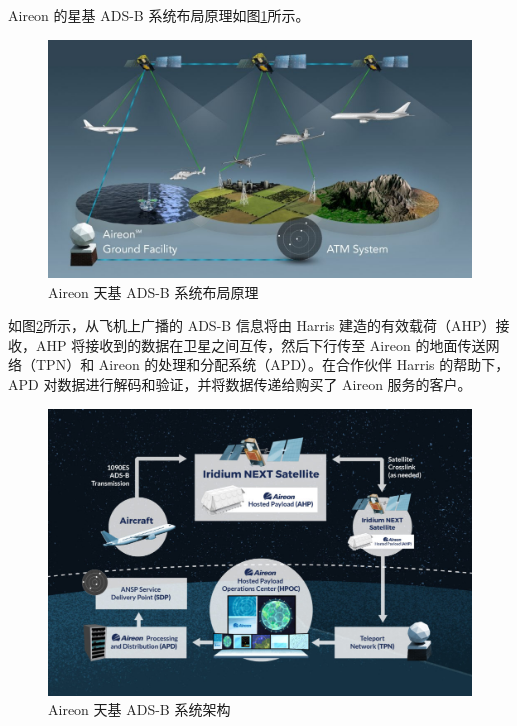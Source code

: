 Aireon 的星基 ADS-B 系统布局原理如图\ref{fig:Aireon_GlobalSpaceBasedADSB_Coverage_Diagram}所示。

\begin{figure}[!htb]
\centering
\includegraphics[width=14cm]{pic/Aireon_GlobalSpaceBasedADSB_Coverage_Diagram-1024x576.jpg}
\caption{Aireon 天基 ADS-B 系统布局原理\protect\footnotemark}
\label{fig:Aireon_GlobalSpaceBasedADSB_Coverage_Diagram}
\end{figure}


如图\ref{fig:System-Diagram-1024x693}所示，从飞机上广播的 ADS-B 信息将由 Harris 建造的有效载荷（AHP）接收，AHP 将接收到的数据在卫星之间互传，然后下行传至 Aireon 的地面传送网络（TPN）和 Aireon 的处理和分配系统（APD）。在合作伙伴 Harris 的帮助下，APD 对数据进行解码和验证，并将数据传递给购买了 Aireon 服务的客户。

\begin{figure}[!htb]
\centering
\includegraphics[width=13cm]{pic/System-Diagram-1024x693.jpg}
\caption{Aireon 天基 ADS-B 系统架构\protect\footnotemark}
\label{fig:System-Diagram-1024x693}
\end{figure}


